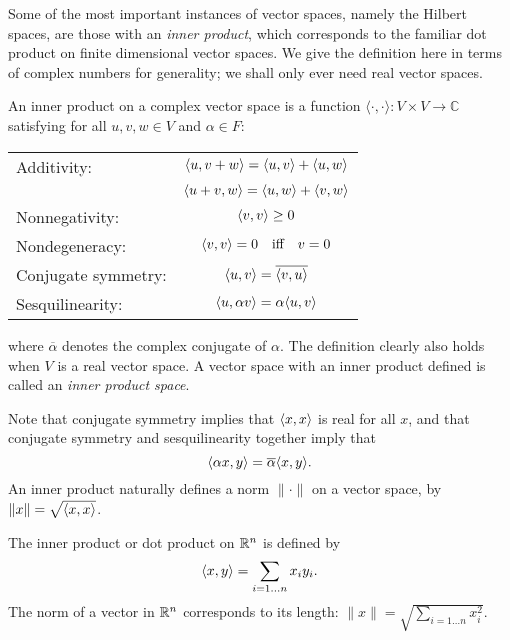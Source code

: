 Some of the most important instances of vector spaces, namely the Hilbert spaces, are those with an \emph{inner product}, which corresponds to the familiar dot product on finite dimensional vector spaces. We give the definition here in terms of complex numbers for generality; we shall only ever need real vector spaces.
\begin{defn}
An inner product on a complex vector space is a function $\langle \cdot ,\cdot \rangle : V \times V \rightarrow \mathbb{C}$ satisfying for all $u,v,w \in V$ and $\alpha \in F$:
\begin{center}
\begin{tabular}{lc}
Additivity: &
$\langle u, v+w \rangle  =  \langle u, v \rangle + \langle u, w \rangle$\\
\vspace{0.1cm}
&$\langle u+v, w \rangle  =  \langle u, w \rangle + \langle v, w \rangle$\\
\vspace{0.1cm}
Nonnegativity: &
$\langle v, v \rangle \ge 0$\\
\vspace{0.1cm}
Nondegeneracy: &
$\langle v, v \rangle = 0\quad \textrm{iff}\quad  v = 0$\\
\vspace{0.1cm}
Conjugate symmetry: &
$\langle u, v \rangle = \overline{\langle v, u \rangle}$\\
\vspace{0.1cm}
Sesquilinearity: &
$ \langle u, \alpha v \rangle = \alpha\langle u, v \rangle$
\end{tabular}
\end{center}
where $\overline{\alpha}$ denotes the complex conjugate of $\alpha$. The definition clearly also holds when $V$ is a real vector space. A vector space with an inner product defined is called an \emph{inner product space}.

Note that conjugate symmetry implies that $\langle x, x \rangle$ is real for all $x$, and that conjugate symmetry and sesquilinearity together imply that
$$\langle \alpha x, y \rangle = \overline{\alpha}\langle x, y \rangle.$$
An inner product naturally defines a norm $\|\cdot\|$ on a vector space, by $\|x\| = \sqrt{\langle x, x \rangle}$.
\end{defn}

\begin{example}
The inner product or dot product on $\mathbb{R}^n$ is defined by
$$\langle x, y \rangle  = \sum_{i = 1\ldots n} x_iy_i.$$
The norm of a vector in $\mathbb{R}^n$ corresponds to its length: $\|x\| = \sqrt{\sum_{i=1\ldots n} x_i^2}$.
\end{example}


